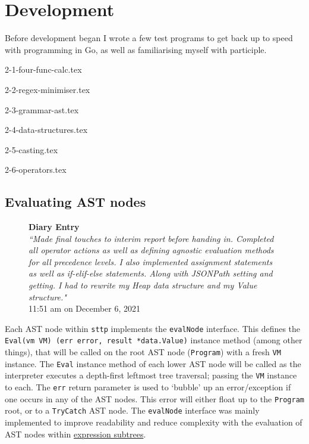 \documentclass[]{full}
\theoremstyle{definition}
\begin{document}
\chapter{Development}
\label{chap:development}

Before development began I wrote a few test programs to get back up to speed with programming in Go, as well as familiarising myself with participle.

{2-1-four-func-calc.tex}

{2-2-regex-minimiser.tex}

{2-3-grammar-ast.tex}

{2-4-data-structures.tex}

{2-5-casting.tex}

{2-6-operators.tex}

\section{Evaluating AST nodes}

\begin{figure}[H]
    \begin{center}
        \textbf{Diary Entry}\\[0.5em]
        \textit{``Made final touches to interim report before handing in. Completed all operator actions as well as defining agnostic evaluation methods for all precedence levels. I also implemented assignment statements as well as if-elif-else statements. Along with JSONPath setting and getting. I had to rewrite my Heap data structure and my Value structure."}\\[0.5em]
        \tiny{11:51 am on December 6, 2021}
    \end{center}
\end{figure}
    
Each AST node within \verb|sttp| implements the \verb|evalNode| interface. This defines the \texttt{Eval(vm VM) (err error, result *data.Value)} instance method (among other things), that will be called on the root AST node (\verb|Program|) with a fresh \verb|VM| instance. The \verb|Eval| instance method of each lower AST node will be called as the interpreter executes a depth-first leftmost tree traversal; passing the \verb|VM| instance to each. The \verb|err| return parameter is used to `bubble' up an error/exception if one occurs in any of the AST nodes. This error will either float up to the \verb|Program| root, or to a \verb|TryCatch| AST node. The \verb|evalNode| interface was mainly implemented to improve readability and reduce complexity with the evaluation of AST nodes within \hyperref[sec:development-ast-nodes-expressions]{expression subtrees}.
\end{document}
